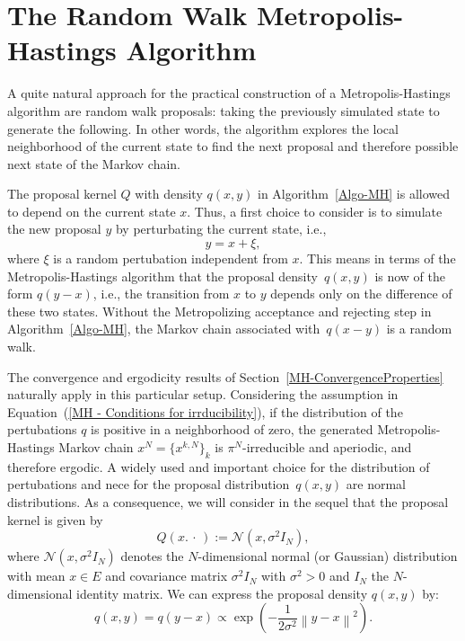 \section{The Random Walk Metropolis-Hastings Algorithm}
\label{MH-RWM}

A quite natural approach for the practical construction of a Metropolis-Hastings algorithm are random walk proposals: taking the previously simulated state to generate the following. In other words, the algorithm explores the local neighborhood of the current state to find the next proposal and therefore possible next state of the Markov chain.

The proposal kernel $Q$ with density $ q(x,y) $ in Algorithm~\ref{Algo-MH} is allowed to depend on the current state $x$. Thus, a first choice to consider is to simulate the new proposal $ y $ by perturbating the current state, i.e.,
\begin{equation}
 \label{MH-RWM:RWM-proposals, First choice}
 y = x + \xi,
\end{equation}
where $ \xi $ is a random pertubation independent from $ x $. This means in terms of the Metropolis-Hastings algorithm that the proposal density~$ q(x,y) $ is now of the form $ q(y-x) $, i.e., the transition from $x$ to $y$ depends only on the difference of these two states. Without the Metropolizing acceptance and rejecting step in Algorithm~\ref{Algo-MH}, the Markov chain associated with~$q(x-y)$ is a random walk.


The convergence and ergodicity results of Section~\ref{MH-ConvergenceProperties} naturally apply in this particular setup. Considering the assumption in Equation~(\ref{MH - Conditions for irrducibility}), if the distribution of the pertubations $q$ is positive in a neighborhood of zero, the generated Metropolis-Hastings Markov chain $ x^{N} = \{ x^{k,N} \}_{k} $ is $ \pi^{N} $-irreducible and aperiodic, and therefore ergodic. A widely used and important choice for the distribution of pertubations and nece for the proposal distribution~$ q(x,y) $ are normal distributions. As a consequence, we will consider in the sequel that the proposal kernel is given by
\begin{equation}
\label{RWM-GaussianProposalKernel}
 Q(x. \, \cdot \,) := \mathcal{N}(x, \sigma^2 I_{N} ),
\end{equation}
where $ \mathcal{N}(x, \sigma^2 I_{N} ) $ denotes the $N$-dimensional normal (or Gaussian) distribution with mean $x \in E$ and covariance matrix $ \sigma^2 I_{N} $ with $ \sigma^2 > 0 $ and $ I_{N} $ the $N$-dimensional identity matrix. We can express the proposal density $ q(x,y) $ by:
\begin{equation}
 q(x,y) = q(y-x) \varpropto  \exp{ \left( - \frac{1}{2 \sigma^2} \left\| y-x \right\|^2  \right) }.
\end{equation}

